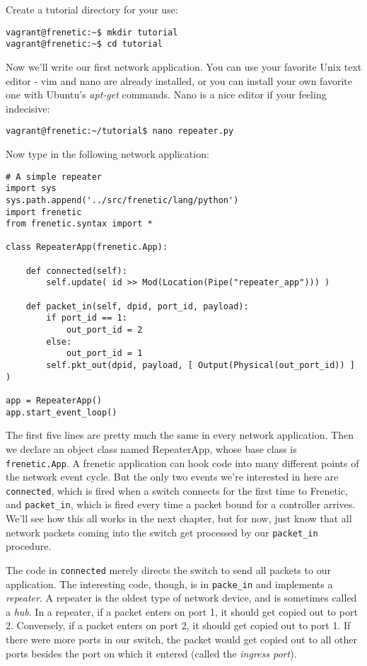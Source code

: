 Create a tutorial directory for your use:

\begin{lstlisting}[style=BashInputStyle]
vagrant@frenetic:~$ mkdir tutorial
vagrant@frenetic:~$ cd tutorial
\end{lstlisting}

Now we'll write our first network application.
You can use your favorite Unix text editor - vim and nano are already installed, or you can install your own favorite
one with Ubuntu's {\it apt-get} commands. 
Nano is a nice editor if your feeling indecisive:

\begin{lstlisting}[style=BashInputStyle]
vagrant@frenetic:~/tutorial$ nano repeater.py
\end{lstlisting}

Now type in the following network application:

\begin{lstlisting}
# A simple repeater
import sys
sys.path.append('../src/frenetic/lang/python')
import frenetic
from frenetic.syntax import *

class RepeaterApp(frenetic.App):

    def connected(self):
        self.update( id >> Mod(Location(Pipe("repeater_app"))) )

    def packet_in(self, dpid, port_id, payload):
        if port_id == 1:
            out_port_id = 2
        else:
            out_port_id = 1
        self.pkt_out(dpid, payload, [ Output(Physical(out_port_id)) ] )

app = RepeaterApp()
app.start_event_loop()
\end{lstlisting}

The first five lines are pretty much the same in every network application. 
Then we declare an object class named RepeaterApp, whose base class is \lstinline{frenetic.App}.
A frenetic application can hook code into many different points of the network event cycle.
But the only two events we're interested in here are
\lstinline{connected}, which is fired when a switch connects for the first time to Frenetic, and 
 \lstinline{packet_in}, which is fired every time a packet
bound for a controller arrives.
We'll see how this all works in the next chapter, but for now, just know that all network packets coming 
into the switch get processed by our \lstinline{packet_in} procedure.

The code in \lstinline{connected} merely directs the switch to send all packets to our application.
The interesting code, though, is in \lstinline{packe_in} and implements a {\it repeater}.
A repeater is the oldest type of network device, and is sometimes called a {\it hub}. 
In a repeater, if a packet enters on port 1, it should get copied out to port 2.  
Conversely, if a packet enters on port 2, it should get copied out to port 1.
If there were more ports in our switch, the packet would get copied out to all other ports besides the port on which  it
entered (called the {\it ingress port}).  

